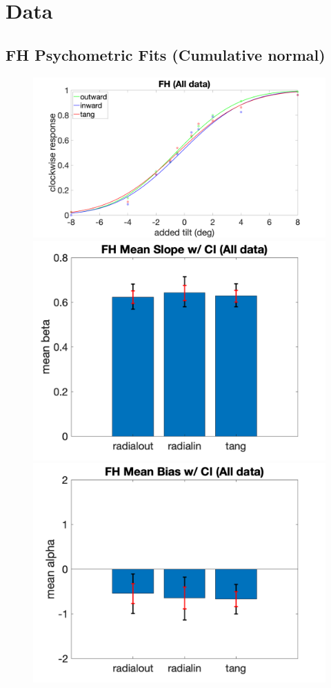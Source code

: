 \documentclass[11pt]{article} %
\begin{document}
\newpage
\section{Data}
\subsection{FH Psychometric Fits (Cumulative normal)}
\begin{figure}[H]
\centering %
\includegraphics[scale=.06]{Images/PF_FH_allcond.png}
\includegraphics[scale=.11]{Images/MeanSlopeError_ci_FH_allcond.png}
\includegraphics[scale=.11]{Images/MeanBiasError_ci_FH_allcond.png}

\end{figure}
\end{document}
